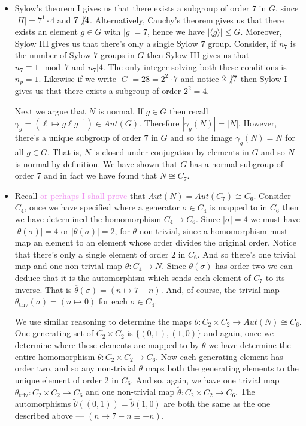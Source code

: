 \documentclass[12pt,letterpaper,boxed]{hmcpset}
\newcommand{\wg}[1]{\textcolor{violet}{#1}}
\newcommand{\abs}[1]{\left|#1\right|}
\newcommand{\inv}{^{-1}}
\begin{document}
\begin{solution}
\begin{itemize}
\item Sylow's theorem I gives us that there exists a subgroup of order
$7$ in $G$, since $\abs{H} = 7^1 \cdot 4$ and $7 \not \vert 4$. 
Alternatively, Cauchy's theorem gives us that there exists an element
$g \in G$ with $\abs{g} = 7$, hence we have $\abs{\langle g \rangle}
\leq G$. Moreover, Sylow III gives us that there's only a single Sylow
$7$ group. Consider, if $n_7$ is the number of Sylow $7$ groups in
$G$ then Sylow III gives us that $n_7 \equiv 1 \mod 7$ and $n_7 \vert
4$. The only integer solving both these conditions is $n_p = 1$. 
Likewise if we write $\abs G = 28 = 2^2 \cdot 7$ and notice $2
\not\vert 7$ then Sylow I gives us that there exists a subgroup of
order $2^2 = 4$.

Next we argue that $N$ is normal. If $g \in G$ then recall $\gamma_g =
(\ell \mapsto g\ell g\inv) \in Aut(G)$. Therefore $\abs{\gamma_g(N)} =
\abs{N}$. However, there's a unique subgroup of order $7$ in $G$ and
so the image $\gamma_g(N) = N$ for all $g \in G$. That is, $N$ is
closed under conjugation by elements in $G$ and so $N$ is normal by
definition. We have shown that $G$ has a normal subgroup of order $7$
and in fact we have found that $N \cong C_7$.


\item Recall \wg{or perhaps I shall prove} that $Aut(N) = Aut(C_7)
\cong C_6$. Consider $C_4$, once we have specified where a generator
$\sigma \in C_4$ is mapped to in $C_6$ then we have determined the
homomorphism $C_4 \to C_6$.
Since $\abs \sigma = 4$ we must have $\abs{\theta(\sigma)} = 4$ or
$\abs{\theta(\sigma)} = 2$, for $\theta$ non-trivial,
 since a homomorphism must map an element
to an element whose order divides the original order.
Notice that there's only a single element of order $2$ in $C_6$. And
so there's one trivial map and one non-trivial map $\overline \theta: C_4
\to N$.
Since $\overline\theta(\sigma)$ has order two we can deduce that it is the
automorphism which sends each element of $C_7$ to its inverse. That is 
$\overline\theta(\sigma) = (n \mapsto 7 - n)$. And, of course, the
trivial map $\theta_{\text{triv}}(\sigma) = (n \mapsto 0)$ for each
$\sigma \in C_4$. 

We use similar reasoning to determine the maps $\theta: C_2 \times C_2
\to Aut(N) \cong C_6$. One generating set of $C_2 \times C_2$ is
$\{(0,1), (1,0)\}$ and again, once we determine where these elements
are mapped to by $\theta$ we have determine the entire homomorphism
$\theta: C_2 \times C_2 \to C_6$. Now each generating element has
order two, and so any non-trivial $\theta$ maps both the generating
elements to the unique element of order $2$ in $C_6$. 
And so, again, we have one trivial map $\theta_{\text{triv}}: C_2
\times C_2 \to C_6$ and one non-trivial map $\tilde \theta: C_2 \times
C_2 \to C_6$. The automorphisms $\tilde \theta((0,1)) =
\tilde\theta(1,0)$ are both the same as the one described above ---
$(n \mapsto 7 - n \equiv -n)$.


\end{itemize}
\end{solution}
\end{document}
